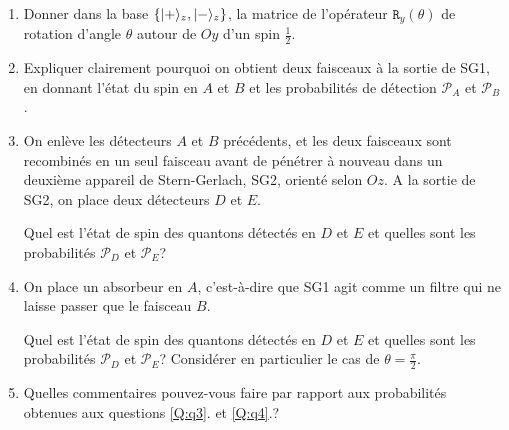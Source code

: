 \begin{enumerate}
\item  Donner dans la base $\{\vert+\rangle_{z},\vert-\rangle_{z}\}$, la matrice de
l'opérateur $\mathtt{R}_{y}(\theta)$ de rotation d'angle $\theta$ autour de $Oy$
d'un spin $\frac{1}{2}$.

\item Expliquer clairement pourquoi on obtient deux faisceaux à la sortie de
SG1, en donnant l'état du spin en $A$ et $B$ et les probabilités de détection
$\mathcal{P}_{A}$ et $\mathcal{P}_{B}$.

\item\label{Q:q3} On enlève les détecteurs $A$ et $B$ précédents, et les deux
faisceaux sont recombinés en un seul faisceau avant de pénétrer à nouveau dans
un deuxième appareil de Stern-Gerlach, SG2, orienté selon $Oz$. A la sortie de
SG2, on place deux détecteurs $D$ et $E$.

Quel est l'état de spin des quantons détectés en $D$ et $E$ et quelles sont les
probabilités $\mathcal{P}_{D}$ et $\mathcal{P}_{E}$?

\item\label{Q:q4}On place un absorbeur en $A$, c'est-à-dire que SG1 agit comme
un filtre qui ne laisse passer que le faisceau $B$.

Quel est l'état de spin des quantons détectés en $D$ et $E$ et quelles sont les
probabilités $\mathcal{P}_{D}$ et $\mathcal{P}_{E}$? Considérer en particulier
le cas de $\theta=\frac{\pi}{2}$.

\item Quelles commentaires pouvez-vous faire par rapport aux probabilités
obtenues aux questions \ref{Q:q3}. et \ref{Q:q4}.?
\end{enumerate}
